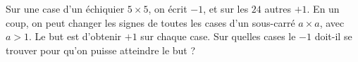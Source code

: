 Sur une case d'un échiquier $5 \times 5$, on écrit $-1$, et sur les $24$ autres $+1$. En un coup, on peut changer les signes de toutes les cases d'un sous-carré $a \times a$, avec $a > 1$. Le but est d'obtenir $+1$ sur chaque case. Sur quelles cases le $-1$ doit-il se trouver pour qu'on puisse atteindre le but ?

